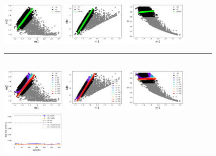 \documentclass[prd,aps,twocolumn,a4paper,showkeys,nofootinbib]{revtex4-1}
\begin{document}
\begin{figure}[]
  \center
  \includegraphics[width=0.28\textwidth]{./Figs/quniform_grey_m1m2.png}
  \includegraphics[width=0.28\textwidth]{./Figs/quniform_grey_m1Mc.png}
  \includegraphics[width=0.28\textwidth]{./Figs/quniform_grey_m1q.png} \\
  \rule[1ex]{14cm}{0.5pt}\\
  \includegraphics[width=0.28\textwidth]{./Figs/quniform_muMc_rainbow_m1m2.png}
  \includegraphics[width=0.28\textwidth]{./Figs/quniform_muMc_rainbow_m1Mc.png}
  \includegraphics[width=0.28\textwidth]{./Figs/quniform_muMc_rainbow_m1q.png} \\
  \includegraphics[width=0.28\textwidth]{./Figs/quniform_muMc_err_m1m2.png}

\end{figure}
\end{document}
